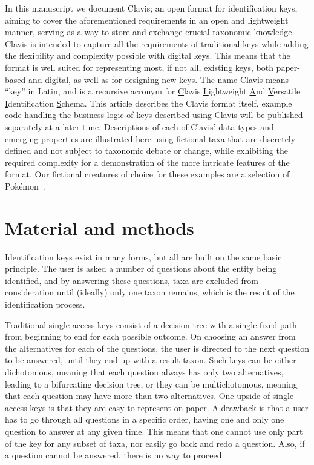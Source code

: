 \documentclass[10pt,letterpaper]{article}
\begin{document}
In this manuscript we document Clavis; an open format for identification keys, aiming to cover the aforementioned requirements in an open and lightweight manner, serving as a way to store and exchange crucial taxonomic knowledge. Clavis is intended to capture all the requirements of traditional keys while adding the flexibility and complexity possible with digital keys. This means that the format is well suited for representing most, if not all, existing keys, both paper-based and digital, as well as for designing new keys. The name Clavis means ``key'' in Latin, and is a recursive acronym for \underline{C}lavis \underline{L}ightweight \underline{A}nd \underline{V}ersatile \underline{I}dentification \underline{S}chema. This article describes the Clavis format itself, example code handling the business logic of keys described using Clavis will be published separately at a later time. Descriptions of each of Clavis' data types and emerging properties are illustrated here using fictional taxa that are discretely defined and not subject to taxonomic debate or change, while exhibiting the required complexity for a demonstration of the more intricate features of the format. Our fictional creatures of choice for these examples are a selection of Pokémon~\cite{Pokemon_wiki}.

\section*{
Material and methods
}
Identification keys exist in many forms, but all are built on the same basic principle. The user is asked a number of questions about the entity being identified, and by answering these questions, taxa are excluded from consideration until (ideally) only one taxon remains, which is the result of the identification process.

Traditional single access keys consist of a decision tree with a single fixed path from beginning to end for each possible outcome. On choosing an answer from the alternatives for each of the questions, the user is directed to the next question to be answered, until they end up with a result taxon. Such keys can be either dichotomous, meaning that each question always has only two alternatives, leading to a bifurcating decision tree, or they can be multichotomous, meaning that each question may have more than two alternatives. One upside of single access keys is that they are easy to represent on paper. A drawback is that a user has to go through all questions in a specific order, having one and only one question to answer at any given time. This means that one cannot use only part of the key for any subset of taxa, nor easily go back and redo a question. Also, if a question cannot be answered, there is no way to proceed.
\end{document}
